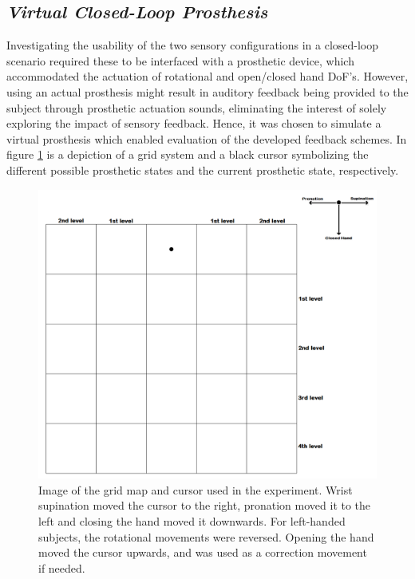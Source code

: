 

\subsection{\textit{Virtual Closed-Loop Prosthesis}}

Investigating the usability of the two sensory configurations in a closed-loop scenario required these to be interfaced with a prosthetic device, which accommodated the actuation of rotational and open/closed hand DoF's. However, using an actual prosthesis might result in auditory feedback being provided to the subject through prosthetic actuation sounds, eliminating the interest of solely exploring the impact of sensory feedback. Hence, it was chosen to simulate a virtual prosthesis which enabled evaluation of the developed feedback schemes. In figure \ref{fig:pa:gridmap} is a depiction of a grid system and a black cursor symbolizing the different possible prosthetic states and the current prosthetic state, respectively.
\begin{figure}[H]                 
	\includegraphics[width=1\textwidth]{figures/gridmap2}  
	\caption{Image of the grid map and cursor used in the experiment. Wrist supination moved the cursor to the right, pronation moved it to the left and closing the hand moved it downwards. For left-handed subjects, the rotational movements were reversed. Opening the hand moved the cursor upwards, and was used as a correction movement if needed.}
	\label{fig:pa:gridmap} 
\end{figure}
